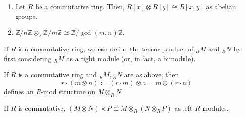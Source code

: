 \begin{eg}
   \begin{enumerate}
   \item Let $R$ be a commutative ring. Then, $R[x] \otimes R[y] \cong R[x,y]$ as abelian groups. 
    \item $\mathbb{Z} / n \mathbb{Z} \otimes_\mathbb{Z} \mathbb{Z} / m \mathbb{Z} \cong \mathbb{Z} / \gcd(m,n) \mathbb{Z}$.
   \end{enumerate} 
\end{eg}
If $R$ is a commutative ring, we can define the tensor product of ${_RM}$ and ${_RN}$ by first considering $_RM$ as a right module (or, in fact, a bimodule).
\begin{prop}
    If $R$ is a commutative ring and ${_RM},{_RN}$ are as above, then \[
    r \cdot (m \otimes n):= (r \cdot m) \otimes n = m \otimes (r \cdot n)
    \]  defines an $R$-mod structure on $M \otimes_R N$.
\end{prop}
If $R$ is commutative, $(M \otimes N) \times P \cong M \otimes_R (N \otimes_R P)$ as left $R$-modules.
